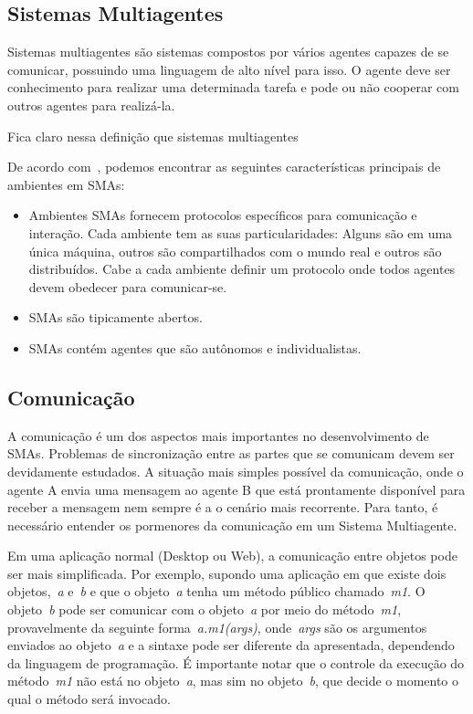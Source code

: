 \subsection{Sistemas Multiagentes}

Sistemas multiagentes são sistemas compostos por vários agentes capazes de se comunicar, possuindo uma linguagem de alto nível para isso. O agente deve ser conhecimento para realizar uma determinada tarefa e pode ou não cooperar com outros agentes para realizá-la.

Fica claro nessa definição que sistemas multiagentes

De acordo com~\cite{sarmento11}, podemos encontrar as seguintes características principais de ambientes em SMAs:
\begin{itemize}
	\item Ambientes SMAs fornecem protocolos específicos para comunicação e interação. Cada ambiente tem as suas particularidades: Alguns são em uma única máquina, outros são compartilhados com o mundo real e outros são distribuídos. Cabe a cada ambiente definir um protocolo onde todos agentes devem obedecer para comunicar-se.
	\item SMAs são tipicamente abertos.
	\item SMAs contém agentes que são autônomos e individualistas.
\end{itemize}

\subsection{Comunicação}

A comunicação é um dos aspectos mais importantes no desenvolvimento de SMAs. Problemas de sincronização entre as partes que se comunicam devem ser devidamente estudados. A situação mais simples possível da comunicação, onde o agente A envia uma mensagem ao agente B que está prontamente disponível para receber a mensagem nem sempre é a o cenário mais recorrente. Para tanto, é necessário entender os pormenores da comunicação em um Sistema Multiagente.

Em uma aplicação normal (Desktop ou Web), a comunicação entre objetos pode ser mais simplificada. Por exemplo, supondo uma aplicação em que existe dois objetos,~\emph{a} e~\emph{b} e que o objeto~\emph{a} tenha um método público chamado~\emph{m1}. O objeto~\emph{b} pode ser comunicar com o objeto~\emph{a} por meio do método~\emph{m1}, provavelmente da seguinte forma~\emph{a.m1(args)}, onde~\emph{args} são os argumentos enviados ao objeto~\emph{a} e a sintaxe pode ser diferente da apresentada, dependendo da linguagem de programação. É importante notar que o controle da execução do método~\emph{m1} não está no objeto~\emph{a}, mas sim no objeto~\emph{b}, que decide o momento o qual o método será invocado.

